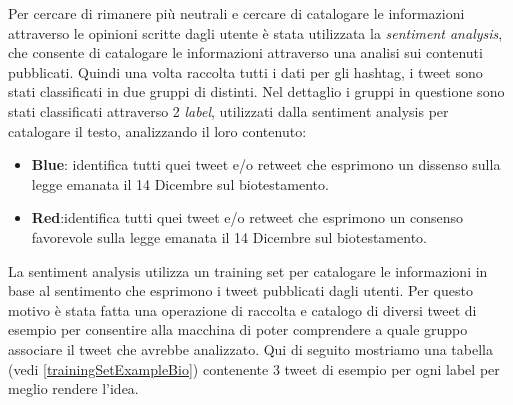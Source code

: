 Per cercare di rimanere più neutrali e cercare di catalogare le informazioni attraverso le opinioni scritte dagli utente è stata utilizzata la \textit{sentiment analysis}, che consente di catalogare le informazioni attraverso una analisi sui contenuti pubblicati. Quindi una volta raccolta tutti i dati per gli hashtag, i tweet sono stati classificati in due gruppi di distinti.
Nel dettaglio i gruppi in questione sono stati classificati attraverso 2 \textit{label}, utilizzati dalla sentiment analysis per catalogare il testo, analizzando il loro contenuto:
\begin{itemize}
\item \textbf{Blue}: identifica tutti quei tweet e/o retweet che esprimono un dissenso sulla legge emanata il 14 Dicembre sul biotestamento.
\item \textbf{Red}:identifica tutti quei tweet e/o retweet che esprimono un consenso favorevole sulla legge emanata il 14 Dicembre sul biotestamento.
\end{itemize}
La sentiment analysis utilizza un training set per catalogare le informazioni in base al sentimento che esprimono i tweet pubblicati dagli utenti. Per questo motivo è stata fatta una operazione di raccolta e catalogo di diversi tweet di esempio per consentire alla macchina di poter comprendere a quale gruppo associare il tweet che avrebbe analizzato.
Qui di seguito mostriamo una tabella (vedi \ref{trainingSetExampleBio}) contenente 3 tweet di esempio per ogni label per meglio rendere l'idea.
